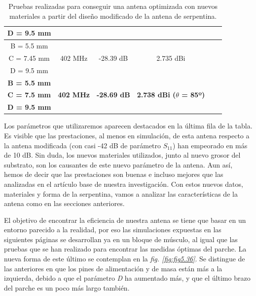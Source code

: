 \begin{table}[h]
{\begin{tabular}{| c | c | c | c | c | c |}
            D = 9.5 mm                    &                                   &                             &                                     \\
            \hline
            B = 5.5 mm                    &                                   &                             &                                     \\
            C = 7.45 mm                   & 402 MHz                           & -28.39 dB                   & 2.735 dBi                           \\
            D = 9.5 mm                    &                                   &                             &                                     \\
            \hline
            \textbf{B = 5.5 mm}           &                                   &                             &                                     \\
            \textbf{C = 7.5 mm}           & \textbf{402 MHz}                  & \textbf{-28.69 dB}          & \textbf{2.738 dBi ($\theta$ = 85º)} \\
            \textbf{D = 9.5 mm}           &                                   &                             &                                     \\
            \hline
            \hline
        \end{tabular}}
    \caption{Pruebas realizadas para conseguir una antena optimizada con nuevos materiales a partir del diseño modificado de la antena de serpentina.}
    \label{tab:tabla5.7}
\end{table}

Los parámetros que utilizaremos aparecen destacados en la última fila de la tabla. Es visible que las prestaciones, al menos en simulación, de esta antena respecto a la antena modificada (con casi -42 dB de parámetro $S_{11}$) han empeorado en más de 10 dB. Sin duda, los nuevos materiales utilizados, junto al nuevo grosor del substrato, son los causantes de este nuevo parámetro de la antena. Aun así, hemos de decir que las prestaciones son buenas e incluso mejores que las analizadas en el artículo base de nuestra investigación. Con estos nuevos datos, materiales y forma de la serpentina, vamos a analizar las características de la antena como en las secciones anteriores.

El objetivo de encontrar la eficiencia de nuestra antena se tiene que basar en un entorno parecido a la realidad, por eso las simulaciones expuestas en las siguientes páginas se desarrollan ya en un bloque de músculo, al igual que las pruebas que se han realizado para encontrar las medidas óptimas del parche. La nueva forma de este último se contemplan en la \textit{fig. \ref{fig:fig5.36}}. Se distingue de las anteriores en que los pines de alimentación y de masa están más a la izquierda, debido a que el parámetro \textit{D} ha aumentado más, y que el último brazo del parche es un poco más largo también.

